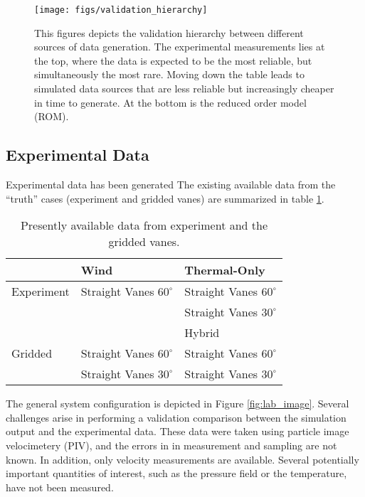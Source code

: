  \begin{figure}[!htb]
   \begin{center}
    \texttt{[image: figs/validation\_hierarchy]}
    \caption{This figures depicts the validation hierarchy between different 
      sources of data generation. The experimental measurements lies at the top, 
      where the data is expected to be the most reliable, but simultaneously the most rare. 
      Moving down the table leads to simulated data sources that are less reliable but 
      increasingly cheaper in time to generate. At the bottom is the reduced order model (ROM).}
    \label{fig:val_hier}
   \end{center}
 \end{figure}

%
%
%
%
%

%
%

\subsection{Experimental Data}

Experimental data has been generated 
The existing available data from the ``truth'' cases (experiment and gridded vanes) 
are summarized in table \ref{tab:val_data}. 

\large
\begin{table}[h]
\centering
\label{my-label}
\begin{tabular}{l|l|l|}
           & Wind                      & Thermal-Only              \\
  \hline 
Experiment & Straight Vanes $60^{\circ}$ & Straight Vanes $60^{\circ}$ \\
           &                           & Straight Vanes $30^{\circ}$ \\
           &                           & Hybrid                    \\
  \hline 
Gridded    & Straight Vanes $60^{\circ}$ & Straight Vanes $60^{\circ}$ \\
           & Straight Vanes $30^{\circ}$ & Straight Vanes $30^{\circ}$ \\
  \hline 
\end{tabular}
  \caption{Presently available data from experiment and 
    the gridded vanes. }
  \label{tab:val_data}
\end{table}

The general system configuration is depicted in Figure \ref{fig:lab_image}. 
Several challenges arise in performing a validation comparison between the
simulation output and the experimental data. These data were taken using
particle image velocimetery (PIV), and the errors in 
in measurement and sampling are not known. 
In addition, only velocity measurements are available. Several
potentially important quantities of interest, such as the pressure field
or the temperature, have not been measured.


